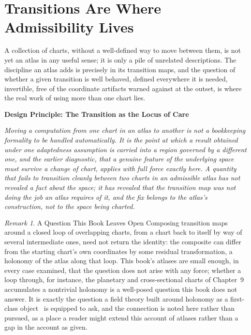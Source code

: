 \documentclass[11pt,fleqn]{book}
\numberwithin{equation}{chapter}
\newenvironment{principle}[1]
  {\begin{principleEnv}
   \noindent\textbf{Design Principle: #1}\par\smallskip\itshape}
  {\end{principleEnv}}
\theoremstyle{plain}
\theoremstyle{definition}
\theoremstyle{remark}
\newtheorem{remark}[theorem]{Remark}
\begin{document}
\section{Transitions Are Where Admissibility Lives}

A collection of charts, without a well-defined way to move between them, is not yet an atlas in any useful sense; it is only a pile of unrelated descriptions. The discipline an atlas adds is precisely in its transition maps, and the question of whether a given transition is well behaved, defined everywhere it is needed, invertible, free of the coordinate artifacts warned against at the outset, is where the real work of using more than one chart lies.

\begin{principle}{The Transition as the Locus of Care}
Moving a computation from one chart in an atlas to another is not a bookkeeping formality to be handled automatically. It is the point at which a result obtained under one adaptedness assumption is carried into a region governed by a different one, and the earlier diagnostic, that a genuine feature of the underlying space must survive a change of chart, applies with full force exactly here. A quantity that fails to transition cleanly between two charts in an admissible atlas has not revealed a fact about the space; it has revealed that the transition map was not doing the job an atlas requires of it, and the fix belongs to the atlas's construction, not to the space being charted.
\end{principle}

\begin{remark}{A Question This Book Leaves Open}
Composing transition maps around a closed loop of overlapping charts, from a chart back to itself by way of several intermediate ones, need not return the identity: the composite can differ from the starting chart's own coordinates by some residual transformation, a holonomy of the atlas along that loop. This book's atlases are small enough, in every case examined, that the question does not arise with any force; whether a loop through, for instance, the planetary and cross-sectional charts of Chapter~9 accumulates a nontrivial holonomy is a well-posed question this book does not answer. It is exactly the question a field theory built around holonomy as a first-class object~\cite{holonomic} is equipped to ask, and the connection is noted here rather than pursued, as a place a reader might extend this account of atlases rather than a gap in the account as given.
\end{remark}
\end{document}
